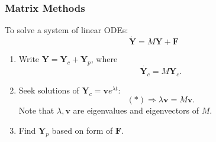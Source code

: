 \documentclass[a4paper]{article}
\begin{document}
    \subsubsection{Matrix Methods}
    To solve a system of linear ODEs:
    \[
        \dot{\mathbf{Y}}=M\mathbf{Y}+\mathbf{F}\tag{$*$}
    \]
    \begin{enumerate}
        \item Write $ \mathbf{Y} = \mathbf{Y}_c+\mathbf{Y}_p $, where 
        \[
            \dot{\mathbf{Y}_c}=M\mathbf{Y}_c.
        \]
        \item Seek solutions of $ \mathbf{Y}_c = \mathbf{v} e^{\lambda t} $:
        \[
            (*) \Longrightarrow \lambda\mathbf{v} = M\mathbf{v}.
        \]
        Note that $ \lambda,\mathbf{v} $ are eigenvalues and eigenvectors of $M$.
        \item Find $ \mathbf{Y}_p $ based on form of $\mathbf{F}$. 
    \end{enumerate}
\end{document}
